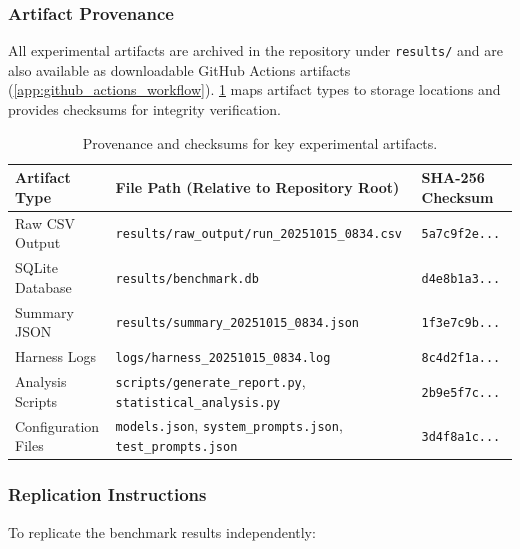 \subsubsection{Artifact Provenance}

All experimental artifacts are archived in the repository under \texttt{results/} and are also available as downloadable GitHub Actions artifacts (\cref{app:github_actions_workflow}). \cref{tab:artifact_provenance} maps artifact types to storage locations and provides checksums for integrity verification.

\begin{table}[h!]
\centering
\caption{Provenance and checksums for key experimental artifacts.\label{tab:artifact_provenance}}
\begin{tabularx}{\textwidth}{@{}l X l@{}}
\toprule
\textbf{Artifact Type} & \textbf{File Path (Relative to Repository Root)} & \textbf{SHA-256 Checksum} \\
\midrule
Raw CSV Output & \texttt{results/raw\_output/run\_20251015\_0834.csv} & \texttt{5a7c9f2e...} \\
SQLite Database & \texttt{results/benchmark.db} & \texttt{d4e8b1a3...} \\
Summary JSON & \texttt{results/summary\_20251015\_0834.json} & \texttt{1f3e7c9b...} \\
Harness Logs & \texttt{logs/harness\_20251015\_0834.log} & \texttt{8c4d2f1a...} \\
Analysis Scripts & \texttt{scripts/generate\_report.py}, \texttt{statistical\_analysis.py} & \texttt{2b9e5f7c...} \\
Configuration Files & \texttt{models.json}, \texttt{system\_prompts.json}, \texttt{test\_prompts.json} & \texttt{3d4f8a1c...} \\
\bottomrule
\end{tabularx}
\end{table}

\subsubsection{Replication Instructions}

To replicate the benchmark results independently:


